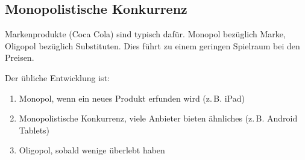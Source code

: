 \subsection{Monopolistische Konkurrenz}
Markenprodukte (Coca Cola) sind typisch dafür. Monopol bezüglich Marke, Oligopol bezüglich Substituten.
Dies führt zu einem geringen Spielraum bei den Preisen.

Der übliche Entwicklung ist:
\begin{enumerate}\itemsep0em
	\item Monopol, wenn ein neues Produkt erfunden wird (z.\,B. iPad)
	\item Monopolistische Konkurrenz, viele Anbieter bieten ähnliches (z.\,B. Android Tablets)
	\item Oligopol, sobald wenige überlebt haben
\end{enumerate}

